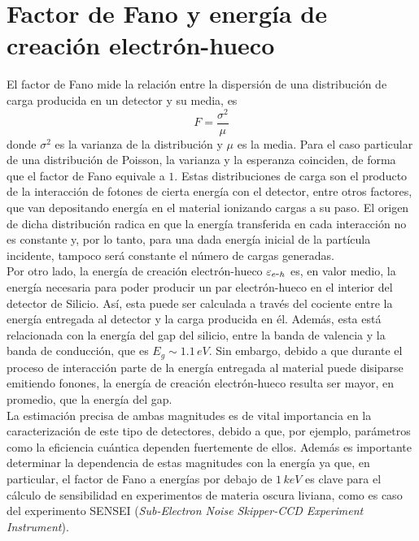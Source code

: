 \section{Factor de Fano y energía de creación electrón-hueco}
\noindent El factor de Fano mide la relación entre la dispersión de una distribución de carga producida en un detector y su media, es
\begin{equation*}
    F = \frac{\sigma^{2}}{\mu}
\end{equation*}
donde $\sigma^{2}$ es la varianza de la distribución y $\mu$ es la media. 
Para el caso particular de una distribución de Poisson, la varianza y la esperanza coinciden, de forma que el factor de Fano equivale a $1$. Estas distribuciones de carga son el producto de la interacción de fotones de cierta energía con el detector, entre otros factores, que van depositando energía en el material ionizando cargas a su paso. El origen de dicha distribución radica en que la energía transferida en cada interacción no es constante y, por lo tanto, para una dada energía inicial de la partícula incidente, tampoco será constante el número de cargas generadas.\\
\indent Por otro lado, la energía de creación electrón-hueco $\varepsilon_{e\mbox{-}h}$ es, en valor medio, la energía necesaria para poder producir un par electrón-hueco en el interior del detector de Silicio. Así, esta puede ser calculada a través del cociente entre la energía entregada al detector y la carga producida en él. Además, esta está relacionada con la energía del gap del silicio, entre la banda de valencia y la banda de conducción, que es $E_{g}\sim 1.1\,\si{eV}$\cite{Janesick}. Sin embargo, debido a que durante el proceso de interacción parte de la energía entregada al material puede disiparse emitiendo fonones, la energía de creación electrón-hueco resulta ser mayor, en promedio, que la energía del gap.\\
\indent La estimación precisa de ambas magnitudes es de vital importancia en la caracterización de este tipo de detectores, debido a que, por ejemplo, parámetros como la eficiencia cuántica dependen fuertemente de ellos. Además es importante determinar la dependencia de estas magnitudes con la energía ya que, en particular, el factor de Fano a energías por debajo de $1\,\si{keV}$ es clave para el cálculo de sensibilidad en experimentos de materia oscura liviana, como es caso del experimento SENSEI (\textit{Sub-Electron Noise Skipper-CCD Experiment Instrument})\cite{barak}.
